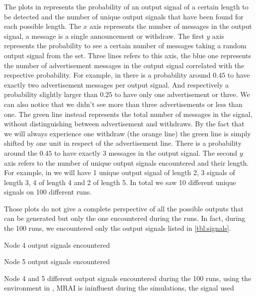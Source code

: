 The plots in  represents the probability of an
output signal of a certain length to be detected and the number of unique output signals
that have been found for each possible length.
The $x$ axis represents the number of messages in the output signal, a message
is a single announcement or withdraw.
The first $y$ axis represents the probability to see a certain number of messages
taking a random output signal from the set.
Three lines refers to this axis, the blue one represents the
number of advertisement messages in the output signal correlated with the
respective probability.
For example, in  there is a probability around $0.45$ to have
exactly two advertisement messages per output signal. And respectively a probability
slightly larger than $0.25$ to have only one advertisement or three.
We can also notice that we didn't see more than three advertisements or less than one.
The green line instead represents the total number of messages in the signal,
without distinguishing between advertisement and withdraws.
By the fact that we will always experience one withdraw (the orange line) the
green line is simply shifted by one unit in respect of the advertisement line.
There is a probability around the $0.45$ to have exactly \num{3} messages in the
output signal.
The second $y$ axis refers to the number of unique output signals encountered and
their length.
For example, in  we will have \num{1} unique output signal
of length \num{2}, \num{3} signals of length \num{3}, \num{4} of length \num{4}
and \num{2} of length \num{5}.
In total we saw \num{10} different unique signals on \num{100} different runs.

Those plots do not give a complete perspective of all the possible outputs
that can be generated but only the one encountered during the runs.
In fact, during the \num{100} runs, we encountered only the output signals listed
in \cref{tbl:signals}.

\begin{table}[h]
	\begin{subtable}[h]{0.45\textwidth}
		
		\caption{Node \num{4} output signals encountered}
		\label{tab:node4_outSignals}
    \end{subtable}
	\hfill
	\begin{subtable}[h]{0.45\textwidth}
		
		\caption{Node \num{5} output signals encountered}
		\label{tab:node5_outSignals}
    \end{subtable}
		\caption{Node 4 and 5 different output signals encountered during the \num{100}
		runs, using the environment in ,
		\ac{MRAI} is ininfluent during the simulations, the signal used }
	\label{tbl:signals}
\end{table}


